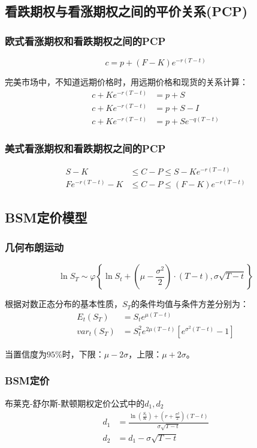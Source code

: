 \documentclass{article}
\begin{document}
\footnotetext[\value{footnote}]{时间价值趋于0}

\subsection{看跌期权与看涨期权之间的平价关系(PCP)}
\subsubsection{欧式看涨期权和看跌期权之间的PCP}
\[c=p+(F-K)e^{-r(T-t)}\]

完美市场中，不知道远期价格时，用远期价格和现货的关系计算：
\begin{align}
    c+Ke^{-r(T-t)}&=p+S\nonumber\\
    c+Ke^{-r(T-t)}&=p+S-I\nonumber\\
    c+Ke^{-r(T-t)}&=p+Se^{-q(T-t)}\nonumber
\end{align}
\subsubsection{美式看涨期权和看跌期权之间的PCP}
\begin{align}
    S-K&\leq C-P\leq S-Ke^{-r(T-t)}\nonumber\\
    Fe^{-r(T-t)}-K&\leq C-P\leq (F-K)e^{-r(T-t)}\nonumber
\end{align}
\subsection{BSM定价模型}
\subsubsection{几何布朗运动}
\[\ln S_T \sim \varphi\left\{\ln S_t+\left(\mu-\frac{\sigma^2}{2}\right) \cdot(T-t), \sigma \sqrt{T-t}\right\}\]

根据对数正态分布的基本性质，$S_T$的条件均值与条件方差分别为：
\begin{align}
    E_t(S_T)&=S_te^{\mu (T-t)}\nonumber\\
    var_t(S_T)&=S_t^2 e^{2\mu(T-t)}[e^{\sigma^2(T-t)}-1]\nonumber
\end{align}

当置信度为$95\%$时，下限：$\mu - 2\sigma$，上限：$\mu + 2\sigma$。
\subsubsection{BSM定价}
布莱克-舒尔斯-默顿期权定价公式中的$d_1,d_2$
\begin{align}
    d_1&=\frac{\ln \left(\frac{S_t}{K}\right)+\left(r+\frac{\sigma^2}{2}\right)(T-t)}{\sigma \sqrt{T-t}}\nonumber\\
    d_2&=d_1-\sigma\sqrt{T-t}\nonumber
\end{align}
\end{document}
